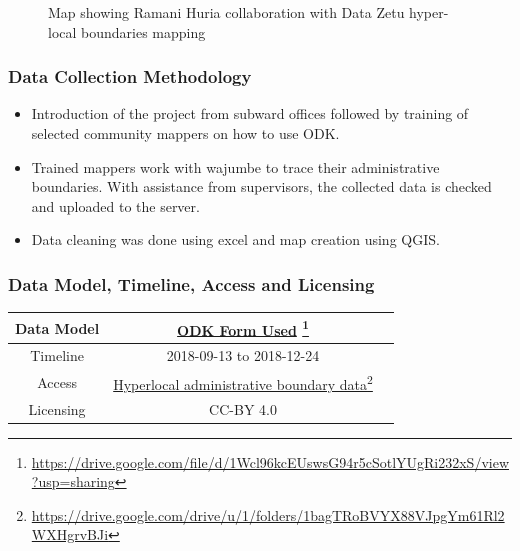 \documentclass[a4paper,12pt,twoside]{article}
\begin{document}
\begin{figure}[h]
  \color{RHgreen}\caption{Map showing Ramani Huria collaboration with Data Zetu hyper-local boundaries mapping}
  \centering
\end{figure}

\subsubsection{Data Collection Methodology}
\begin{itemize}
    \item Introduction of the project from subward offices followed by training of selected community mappers on how to use ODK.
    \item Trained mappers work with wajumbe to trace their administrative boundaries. With assistance from supervisors, the collected data is checked and uploaded to the server. 
    \item Data cleaning was done using excel  and map creation using QGIS.
\end{itemize}

\medskip
\subsubsection{Data Model, Timeline, Access and Licensing}
\begin{center}
\begin{tabular}{|c|c|c|}  
 \hline
Data Model &
        \href{https://drive.google.com/file/d/1Wcl96kcEUswsG94r5cSotlYUgRi232xS/view?usp=sharing}{ODK Form Used} \footnote{\url{https://drive.google.com/file/d/1Wcl96kcEUswsG94r5cSotlYUgRi232xS/view?usp=sharing}} \\
 \hline
  Timeline  &  2018-09-13 to 2018-12-24 \\
\hline  
 Access  & 
    \href{https://drive.google.com/drive/u/1/folders/1bagTRoBVYX88VJpgYm61Rl2WXHgrvBJi}{Hyperlocal administrative boundary data}\footnote{\url{https://drive.google.com/drive/u/1/folders/1bagTRoBVYX88VJpgYm61Rl2WXHgrvBJi}} \\
   
\hline 
    Licensing & CC-BY 4.0 \\
\hline
\end{tabular}
\end{center}
\end{document}
